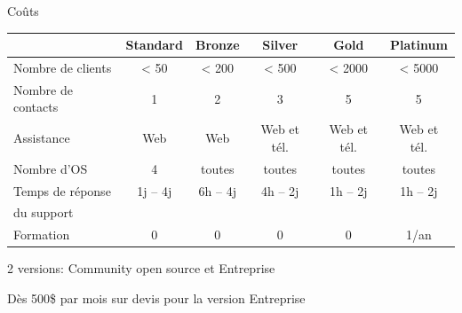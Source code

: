 \documentclass[aspectratio=169]{beamer}
\begin{document}
\begin{frame}{Coûts}
\begin{center}

 \begin{tabular}{|l|ccccc|}
    \hline
    & Standard & Bronze & Silver & Gold & Platinum \\
    \hline
    \hline
    Nombre de clients & < 50 & < 200 & < 500 & < 2000 & < 5000 \\
    \hline
    Nombre de contacts & 1 & 2 & 3 & 5 & 5 \\
    \hline
    Assistance & Web & Web & Web et tél.& Web et tél. & Web et tél. \\
    \hline
    Nombre d'OS & 4 & toutes & toutes & toutes & toutes \\
    \hline
    Temps de réponse & 1j -- 4j & 6h -- 4j & 4h -- 2j & 1h -- 2j & 1h -- 2j \\
    du support &  \\
    \hline
    Formation & 0 & 0 & 0 & 0 & 1/an \\
    \hline
 \end{tabular}
\end{center}

2 versions: Community open source et Entreprise

Dès 500\$ par mois sur devis pour la version Entreprise
\end{frame}
\end{document}
